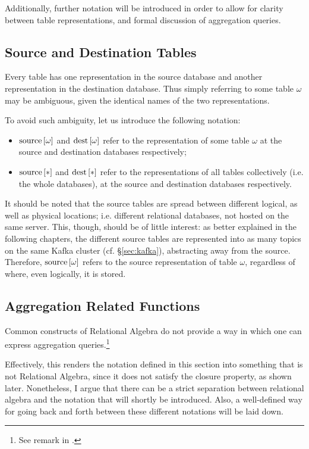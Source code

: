 Additionally, further notation will be introduced in order to allow for clarity between table representations, and formal discussion of aggregation queries.


\subsection{Source and Destination Tables}

Every table has one representation in the source database and another representation in the destination database.
Thus simply referring to some table $\omega$ may be ambiguous, given the identical names of the two representations.

To avoid such ambiguity, let us introduce the following notation:

\begin{itemize}
	\item $\text{source}\left[{\omega}\right]$ and $\text{dest}\left[{\omega}\right]$ refer to the representation of some table $\omega$ at the source and destination databases respectively;
	\item $\text{source}\left[{*}\right]$ and $\text{dest}\left[{*}\right]$ refer to the representations of all tables collectively (i.e. the whole databases), at the source and destination databases respectively.
\end{itemize}

It should be noted that the source tables are spread between different logical, as well as physical locations; i.e. different relational databases, not hosted on the same server.
This, though, should be of little interest: as better explained in the following chapters, the different source tables are represented into as many topics on the same Kafka cluster (cf. \S \ref{sec:kafka}), abstracting away from the source.
Therefore, $\text{source}\left[{\omega}\right]$ refers to the source representation of table $\omega$, regardless of where, even logically, it is stored.


\subsection{Aggregation Related Functions}

Common constructs of Relational Algebra do not provide a way in which one can express aggregation queries.\footnote{%
See remark in \cite[p.~154]{dbms}.
}

Effectively, this renders the notation defined in this section into something that is not Relational Algebra, since it does not satisfy the closure property, as shown later.
Nonetheless, I argue that there can be a strict separation between relational algebra and the notation that will shortly be introduced.
Also, a well-defined way for going back and forth between these different notations will be laid down.

